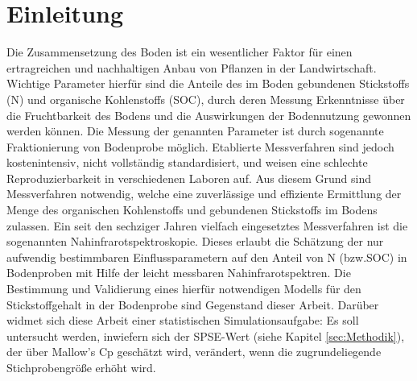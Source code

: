 \section{Einleitung}
\label{sec:Einleitung}

    Die Zusammensetzung des Boden ist ein wesentlicher Faktor für einen ertragreichen und nachhaltigen Anbau von Pflanzen in der Landwirtschaft.
    Wichtige Parameter hierfür sind die Anteile des im Boden gebundenen Stickstoffs (N) und organische Kohlenstoffs (SOC), durch deren Messung Erkenntnisse über die Fruchtbarkeit des Bodens und die Auswirkungen der Bodennutzung gewonnen werden können.\cite{Poeplau2013}
    Die Messung der genannten Parameter ist durch sogenannte Fraktionierung von Bodenprobe möglich.
    Etablierte Messverfahren sind jedoch kostenintensiv, nicht vollständig standardisiert, und weisen eine schlechte Reproduzierbarkeit in verschiedenen Laboren auf.\cite{Poeplau2013}
    Aus diesem Grund sind Messverfahren notwendig, welche eine zuverlässige und effiziente Ermittlung der Menge des organischen Kohlenstoffs und gebundenen Stickstoffs im Bodens zulassen.
    Ein seit den sechziger Jahren vielfach eingesetztes Messverfahren ist die sogenannten Nahinfrarotspektroskopie. \cite{Agelet2010}
    Dieses erlaubt die Schätzung der nur aufwendig bestimmbaren Einflussparametern auf den Anteil von N (bzw.SOC) in Bodenproben mit Hilfe der leicht messbaren Nahinfrarotspektren.
    Die Bestimmung und Validierung eines hierfür notwendigen Modells für den Stickstoffgehalt in der Bodenprobe sind Gegenstand dieser Arbeit.
    Darüber widmet sich diese Arbeit einer statistischen Simulationsaufgabe: Es soll untersucht werden, inwiefern sich der SPSE-Wert (siehe Kapitel \ref{sec:Methodik}), der über Mallow's Cp geschätzt wird, verändert, wenn die zugrundeliegende Stichprobengröße erhöht wird.

